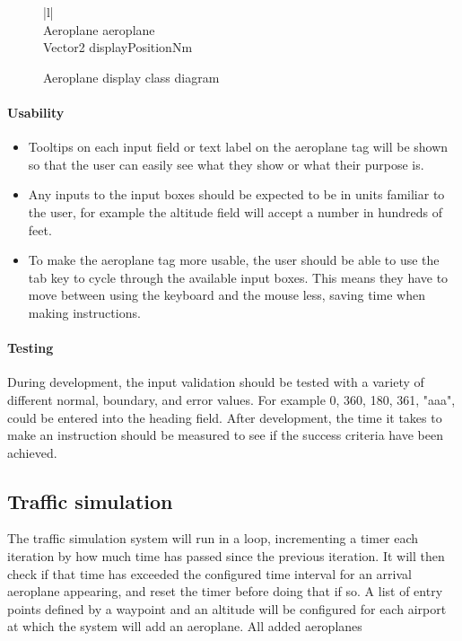 \documentclass{article}
\begin{document}
\begin{figure}[H]
\centering
\begin{tabular}{ |l| } 
\hline
{} \\
\hline
Aeroplane aeroplane \\
Vector2 displayPositionNm \\
\hline
\end{tabular}
\caption{\label{fig:aeroplanedisplayclass}Aeroplane display class diagram}
\end{figure}

\paragraph{Usability}
\begin{itemize}
    \item Tooltips on each input field or text label on the aeroplane tag will be shown so that the user can easily see what they show or what their purpose is.
    \item Any inputs to the input boxes should be expected to be in units familiar to the user, for example the altitude field will accept a number in hundreds of feet.
    \item To make the aeroplane tag more usable, the user should be able to use the tab key to cycle through the available input boxes.
    This means they have to move between using the keyboard and the mouse less, saving time when making instructions.
\end{itemize}

\paragraph{Testing}
During development, the input validation should be tested with a variety of different normal, boundary, and error values.
For example 0, 360, 180, 361, "aaa", could be entered into the heading field.
After development, the time it takes to make an instruction should be measured to see if the success criteria have been achieved.

\subsection{Traffic simulation}
The traffic simulation system will run in a loop, incrementing a timer each iteration by how much time has passed since the previous iteration.
It will then check if that time has exceeded the configured time interval for an arrival aeroplane appearing, and reset the timer before doing that if so.
A list of entry points defined by a waypoint and an altitude will be configured for each airport at which the system will add an aeroplane.
All added aeroplanes 
\end{document}
